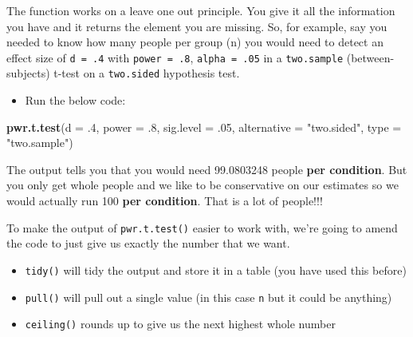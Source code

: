 \documentclass[]{book}
\newenvironment{Shaded}{\begin{snugshade}}{\end{snugshade}}
\newcommand{\DataTypeTok}[1]{\textcolor[rgb]{0.13,0.29,0.53}{#1}}
\newcommand{\FloatTok}[1]{\textcolor[rgb]{0.00,0.00,0.81}{#1}}
\newcommand{\KeywordTok}[1]{\textcolor[rgb]{0.13,0.29,0.53}{\textbf{#1}}}
\newcommand{\NormalTok}[1]{#1}
\newcommand{\OperatorTok}[1]{\textcolor[rgb]{0.81,0.36,0.00}{\textbf{#1}}}
\newcommand{\StringTok}[1]{\textcolor[rgb]{0.31,0.60,0.02}{#1}}
\providecommand{\tightlist}{%
  \setlength{\itemsep}{0pt}\setlength{\parskip}{0pt}}
\begin{document}
The function works on a leave one out principle. You give it all the information you have and it returns the element you are missing. So, for example, say you needed to know how many people per group (n) you would need to detect an effect size of \texttt{d\ =\ .4} with \texttt{power\ =\ .8}, \texttt{alpha\ =\ .05} in a \texttt{two.sample} (between-subjects) t-test on a \texttt{two.sided} hypothesis test.

\begin{itemize}
\tightlist
\item
  Run the below code:
\end{itemize}

\begin{Shaded}
\begin{Highlighting}[]
\KeywordTok{pwr.t.test}\NormalTok{(}\DataTypeTok{d =} \FloatTok{.4}\NormalTok{,}
           \DataTypeTok{power =} \FloatTok{.8}\NormalTok{,}
           \DataTypeTok{sig.level =} \FloatTok{.05}\NormalTok{,}
           \DataTypeTok{alternative =} \StringTok{"two.sided"}\NormalTok{,}
           \DataTypeTok{type =} \StringTok{"two.sample"}\NormalTok{)}
\end{Highlighting}
\end{Shaded}

The output tells you that you would need 99.0803248 people \textbf{per condition}. But you only get whole people and we like to be conservative on our estimates so we would actually run 100 \textbf{per condition}. That is a lot of people!!!

To make the output of \texttt{pwr.t.test()} easier to work with, we're going to amend the code to just give us exactly the number that we want.

\begin{itemize}
\tightlist
\item
  \texttt{tidy()} will tidy the output and store it in a table (you have used this before)
\item
  \texttt{pull()} will pull out a single value (in this case \texttt{n} but it could be anything)
\item
  \texttt{ceiling()} rounds up to give us the next highest whole number
\end{itemize}

\begin{Shaded}
\end{Shaded}
\end{document}

